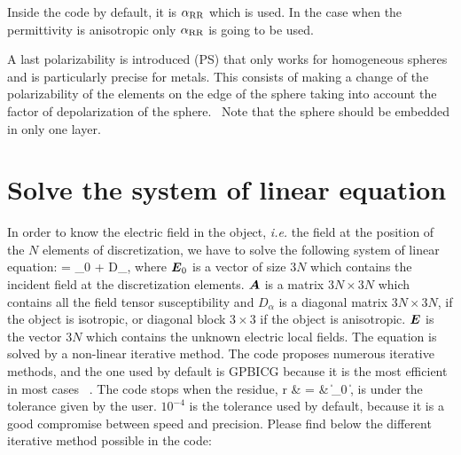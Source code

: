 Inside the code by default, it is $\alpha_{\rm RR}$ which is used. In
the case when the permittivity is anisotropic only $\alpha_{\rm RR}$
is going to be used.

A last polarizability is introduced (PS) that only works for
homogeneous spheres and is particularly precise for metals.  This
consists of making a change of the polarizability of the elements on
the edge of the sphere taking into account the factor of
depolarization of the sphere.~\cite{Rahmani_AJ_04} Note that the
sphere should be embedded in only one layer.

\section{Solve the system of linear equation}

In order to know the electric field in the object, {\it i.e.} the
field at the position of the $N$ elements of discretization, we have
to solve the following system of linear equation:
\be {} = _0 +  D_\alpha {},\ee
where $\boldsymbol{E}_0$ is a vector of size $3N$ which contains the incident
field at the discretization elements. $\boldsymbol{A}$ is a matrix
$3N\times 3N$ which contains all the field tensor susceptibility and
$D_\alpha$ is a diagonal matrix $3N\times 3N$, if the object is
isotropic, or diagonal block $3\times 3$ if the object is anisotropic.
$\boldsymbol{E}$ is the vector $3N$ which contains the unknown electric local
fields. The equation is solved by a non-linear iterative method. The
code proposes numerous iterative methods, and the one used by default
is GPBICG because it is the most efficient in most cases
~\cite{Chaumet_OL_09}.  The code stops when the residue,
\be r & = &  {
  \|_0 \|}, \ee
is under the tolerance given by the user. $10^{-4}$ is the tolerance
used by default, because it is a good compromise between speed and
precision. Please find below the different iterative method possible
in the code:
